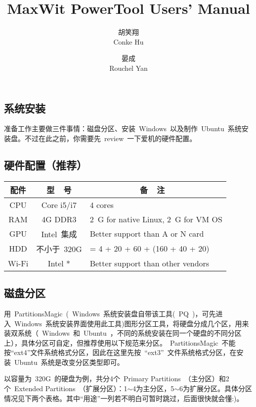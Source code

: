 \documentclass[a4paper,11pt,oneside]{article}
\title{MaxWit PowerTool Users' Manual}
\author{胡笑翔\\Conke Hu \and 晏成\\Rouchel Yan}
\begin{document}
\begin{CJK*}{UTF8}{gbsn}
\CJKtilde
\maketitle
\tableofcontents

\newpage
\fi

\section{系统安装}
准备工作主要做三件事情：磁盘分区、安装~Windows~以及制作~Ubuntu~系统安装盘。不过在此之前，你需要先~review~一下爱机的硬件配置。

\subsection{硬件配置（推荐）}

\begin{tabular}{|c|c|l|}
\hline
\textbf{配件} & \textbf{型\ \ 号} & \textbf{\ \ \ \ \ \ \ \ \ \ \ 备\ \ 注} \\ \hline
CPU & Core i5/i7 & 4 cores\\ \hline
RAM & 4G DDR3 & 2~G for native Linux, 2~G for VM OS \\ \hline
GPU & Intel~集成 & Better support than A or N card\\ \hline
HDD & 不小于~320G & = 4 + 20 + 60 + (160 + 40 + 20) \\ \hline
Wi-Fi & Intel * & Better support than other vendors \\ \hline
\end{tabular}

\subsection{磁盘分区}
用~PartitionsMagic~(~Windows~系统安装盘自带该工具(~PQ~)，可先进入~Windows~系统安装界面使用此工具)图形分区工具，将硬盘分成几个区，用来装双系统（~Windows~和~Ubuntu~，不同的系统安装在同一个硬盘的不同分区上），具体分区可自定，但推荐使用以下规范来分区。~PartitionsMagic~不能按``ext4''文件系统格式分区，因此在这里先按~``ext3''~文件系统格式分区，在安装~Ubuntu~系统是改变分区类型即可。

以容量为~320G~的硬盘为例，共分4个~Primary Partitions~（主分区）和2个~Extended Partitions~（扩展分区）：1$\sim$4为主分区，5$\sim$6为扩展分区。具体分区情况见下两个表格。其中``用途''一列若不明白可暂时跳过，后面很快就会懂:)。


\end{CJK*}
\end{document}
